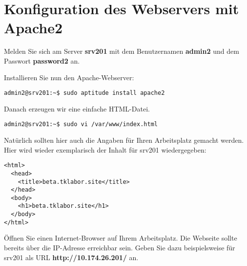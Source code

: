 \section{Konfiguration des Webservers mit Apache2}

Melden Sie sich am Server \textbf{srv201} mit dem Benutzernamen \textbf{admin2}
und dem Passwort \textbf{password2} an.

Installieren Sie nun den Apache-Webserver:
\begin{lstlisting}
admin2@srv201:~$ sudo aptitude install apache2
\end{lstlisting}

Danach erzeugen wir eine einfache HTML-Datei.
\begin{lstlisting}
admin2@srv201:~$ sudo vi /var/www/index.html
\end{lstlisting}
Natürlich sollten hier auch die Angaben für Ihren Arbeitsplatz gemacht werden. Hier wird wieder exemplarisch 
der Inhalt für srv201 wiedergegeben:
\begin{scriptsize}
\begin{lstlisting}
<html>
  <head>
    <title>beta.tklabor.site</title>
  </head>  
  <body>
    <h1>beta.tklabor.site</h1>
  </body>
</html>
\end{lstlisting}
\end{scriptsize}
Öffnen Sie einen Internet-Browser auf Ihrem Arbeitsplatz. Die Webseite sollte bereits über die IP-Adresse erreichbar sein. Geben Sie dazu
beispielsweise für srv201 als URL \textbf{http://10.174.26.201/} an.
